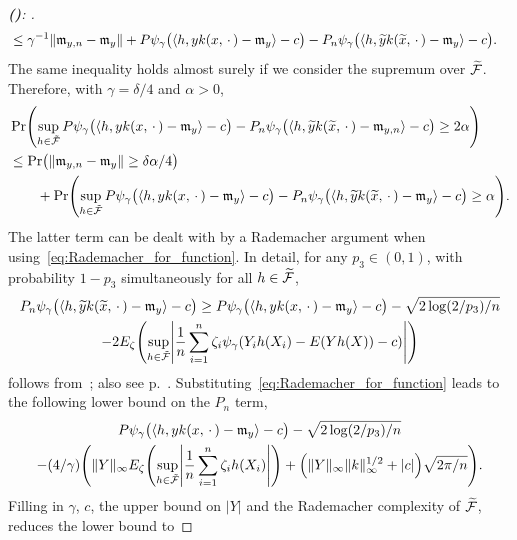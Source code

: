\documentclass[AHL,Unicode,longabstracts,published]{cedram}
\theoremstyle{remark}
\newcommand{\clF}{\mathcal{F}}
\newcommand{\mean}{\mathfrak{m}}
\let\oldtilde\tilde
\renewcommand*{\tilde}[1]{\mathchoice{\widetilde{#1}}{\widetilde{#1}}{\oldtilde{#1}}{\oldtilde{#1}}}
\let\originalleft\left
\let\originalright\right
\renewcommand{\left}{\mathopen{}\mathclose\bgroup\originalleft}
\renewcommand{\right}{\aftergroup\egroup\originalright}
\newcounter{setofstep}
\newcounter{step}[setofstep]
\newenvironment{step}[1][]{\refstepcounter{step}\begin{proof}[{\textbf{(\thestep)}\if#1\empty\else: #1\fi}]}{\let\qed\relax\end{proof}}
\renewcommand{\thestep}{\alph{step}}
\begin{document}
\begin{proofc}
\begin{step}
\begin{align*}
&\leq \gamma^{-1} \|\mean_{y,n} - \mean_y\| + P \psi_\gamma\bigl(\langle h, y k(x,\,\cdot\,) - \mean_{y} \rangle - c\bigr) - P_n \psi_\gamma\bigl(\langle h, \tilde y k(\tilde x,\,\cdot\,) - \mean_{y} \rangle - c\bigr).
\end{align*}
The same inequality holds almost surely if we consider the supremum over $\tilde{\clF}$. Therefore, with $\gamma = \delta/4$ and $\alpha > 0$,
\begin{align*}
&\Pr\left(\sup_{h \in \tilde{\clF}} P \psi_\gamma\bigl(\langle h, y k(x,\,\cdot\,) - \mean_{y} \rangle - c\bigr)- P_n \psi_\gamma\bigl(\langle h, \tilde y k(\tilde x,\,\cdot\,) - \mean_{y,n} \rangle - c\bigr) \geq 2 \alpha\right) \\
&\leq \Pr\bigl(\|\mean_{y,n} - \mean_y\| \geq \delta \alpha /4\bigr) \\
& \qquad + \Pr\left(\sup_{h \in \tilde{\clF}} P \psi_\gamma\bigl(\langle h, y k(x,\,\cdot\,) - \mean_{y} \rangle - c\bigr)- P_n \psi_\gamma\bigl(\langle h, \tilde y k(\tilde x,\,\cdot\,) - \mean_{y} \rangle - c\bigr) \geq \alpha\right).
\end{align*}
The latter term can be dealt with by a Rademacher argument when using~\eqref{eq:Rademacher_for_function}. In detail, for any $p_3 \in (0,1)$, with probability $1-p_3$ simultaneously for all $h \in \tilde{\clF}$,
\begin{multline*}
P_n \psi_\gamma\bigl(\langle h, \tilde y k(\tilde x,\,\cdot\,) - \mean_{y} \rangle - c\bigr) \geq P \psi_\gamma\bigl(\langle h, y k(x,\,\cdot\,) - \mean_{y} \rangle - c\bigr) - \sqrt{2\log(2/p_3)/n} \\
- 2 E_\zeta \left(\sup_{h \in \tilde{\clF}} \left|\frac{1}{n} \sum_{i=1}^n \zeta_i \psi_\gamma(Y_i h(X_i) - E(Y h(X)) - c) \right| \right)
\end{multline*}
follows from~\cite[Theorem~3.4.5]{GINE15}; also see p.~\pageref{sec:Rademacher_expl}. Substituting~\eqref{eq:Rademacher_for_function} leads to the following lower bound on the $P_n$ term,
\begin{multline*}
P \psi_\gamma\bigl(\langle h, y k(x,\,\cdot\,) - \mean_{y} \rangle - c\bigr) - \sqrt{2\log(2/p_3)/n} \\
- (4/\gamma) \left(\|Y\|_\infty E_\zeta \left(\sup_{h \in \tilde{\clF}} \left|\frac{1}{n} \sum_{i=1}^n \zeta_i h(X_i) \right| \right) + \left(\|Y\|_\infty \|k\|_\infty^{1/2} + |c|\right) \sqrt{2\pi/ n}\right).
\end{multline*}
Filling in $\gamma$, $c$, the upper bound on $|Y|$ and the Rademacher complexity of $\tilde{\clF}$, reduces the lower bound to

\end{step}
\end{proofc}
\end{document}
